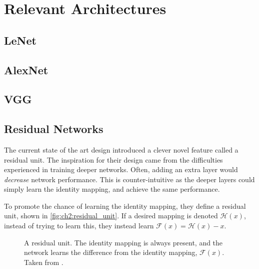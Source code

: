 \section{Relevant Architectures}

\subsection{LeNet}
\subsection{AlexNet}
\subsection{VGG}
\subsection{Residual Networks}
  The current state of the art design introduced a clever novel feature called
  a residual unit\citep{he_deep_2015,he_identity_2016}. The inspiration for their design came from the difficulties
  experienced in training deeper networks. Often, adding an extra layer would
  \emph{decrease} network performance. This is counter-intuitive as the deeper
  layers could simply learn the identity mapping, and achieve the same
  performance.

  To promote the chance of learning the identity mapping, they define
  a residual unit, shown in \autoref{fig:ch2:residual_unit}. If a desired mapping
  is denoted $\mathcal{H}(x)$, instead of trying to learn this, they instead
  learn $\mathcal{F}(x) = \mathcal{H}(x) - x$. 
  \begin{figure}
    \centering
    \caption[The residual unit from ResNet]
          {A residual unit. The identity mapping is always present, and the
            network learns the difference from the identity mapping, $\mathcal{F}(x)$.
            Taken from \citep{he_deep_2015}.}
      \label{fig:ch2:residual_unit}
  \end{figure}



